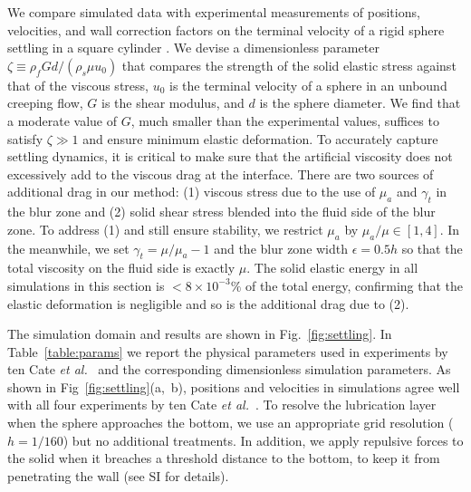\documentclass[times, 10pt]{article}
\begin{document}
\begin{multicols}{2}
We compare simulated data with experimental measurements of positions, velocities, and wall correction factors on the terminal velocity of a rigid sphere settling in a square cylinder \cite{tenCate02, miyamura81}.
We devise a dimensionless parameter $\zeta \equiv \rho_f G d / (\rho_s \mu u_0)$ that compares the strength of the solid elastic stress against that of the viscous stress,
$u_0$ is the terminal velocity of a sphere in an unbound creeping flow, $G$ is the shear modulus, and $d$ is the sphere diameter.
We find that a moderate value of $G$, much smaller than the experimental values, suffices to satisfy $\zeta \gg 1$ and ensure minimum elastic deformation.
%
To accurately capture settling dynamics, it is critical to make sure that the artificial viscosity does not excessively add to the viscous drag at the interface.
There are two sources of additional drag in our method:
(1) viscous stress due to the use of $\mu_a$ and $\gamma_t$ in the blur zone
and
(2) solid shear stress blended into the fluid side of the blur zone.
To address (1) and still ensure stability, we restrict $\mu_a$ by $\mu_a/\mu \in [1,4]$.
In the meanwhile, we set $\gamma_t = \mu/\mu_a - 1$ and the blur zone width $\epsilon=0.5h$ so that the total viscosity on the fluid side is exactly $\mu$.
The solid elastic energy in all simulations in this section is $<8 \times 10^{-3}\%$ of the total energy,
confirming that the elastic deformation is negligible and so is the additional drag due to (2).

The simulation domain and results are shown in Fig.~\ref{fig:settling}.
In Table~\ref{table:params} we report the physical parameters used in experiments by ten Cate \textit{et al.}~\cite{tenCate02} and the corresponding dimensionless simulation parameters.
As shown in  Fig~\ref{fig:settling}(a,~b), positions and velocities in simulations agree well with all four experiments by ten Cate \textit{et al.}~\cite{tenCate02}.
To resolve the lubrication layer when the sphere approaches the bottom, we use an appropriate grid resolution ($h =1/160$) but no additional treatments.
In addition, we apply repulsive forces to the solid when it breaches a threshold distance to the bottom, to keep it from penetrating the wall (see SI for details).


\end{multicols}
\end{document}
